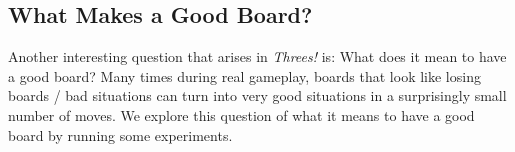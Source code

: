 \documentclass[11pt]{article}
\begin{document}
\begin{comment}
The question remains of whether this score is attainable. We note that this is attainable through the following process. Suppose that the tiles entered the board in the following process:\\
\begin{itemize}
\item At the beginning pieces alternate between $1$ and $2$.
\item First, pieces come in from the bottom left, and we push these to the right. 
\begin{itemize}
\item continue this until you are left with $2, 3, 6, 12$ in the bottom row.
\item we can do this with every row (with last value inserted alternating between 1 and 2), and then go down, inserting alternating 1 and 2 at the top in the first column to get 
\[ \begin{array}{cccc}
2 & & & \\
1 & & & \\
2 & & & \\
6 &12&24&48 \end{array} \]
\end{itemize}
\item We now go down until we fill in the whole board like
\[ \begin{array}{cccc} 
2 & & & \\
3 & & & \\
6 & & & \\
12&24 &48&96\end{array} \]
\item We can do a similar process in the other direction to achieve
\[ \begin{array}{cccc}
12&6 & 3& 2 \\
24& & &  \\
48& & & \\
96 & 192 & 284& 568\end{array} \]
\end{itemize}
\end{comment}

\subsection{What Makes a Good Board?}

Another interesting question that arises in \emph{Threes!} is: What does it mean to have a good board? Many times during real gameplay, boards that look like losing boards / bad situations can turn into very good situations in a surprisingly small number of moves. We explore this question of what it means to have a good board by running some experiments. 
\end{document}
